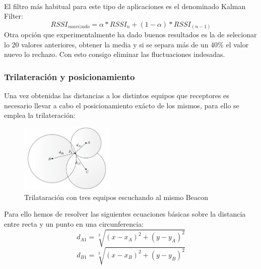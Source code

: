 \documentclass[a4paper ,12pt, onecolumn]{article}
\begin{document}
            \paragraph{}
            El filtro más habitual para este tipo de aplicaciones es el denominado Kalman Filter:
            \begin{equation}
                RSSI_{suavizado} = \alpha * RSSI_{n} + (1-\alpha) * RSSI_{(n-1)}
            \end{equation}
            Otra opción que experimentalmente ha dado buenos resultados es la de selecionar lo 20 valores anteriores,
            obtener la media y si se separa más de un 40\% el valor nuevo lo rechazo. Con esto consigo eliminar las 
            fluctuaciones indesadas.
        \subsubsection{Trilateración y posicionamiento}
            Una vez obtenidas las distancias a los distintos equipos que receptores es necesario llevar a cabo el
            posicionamiento exácto de los mismos, para ello se emplea la trilateración:
            \begin{center}
                \begin{figure}[h]
                    \centering
                    \includegraphics[width=0.4\textwidth]{trilateration_circle.png}
                    \caption{Trilataración con tres equipos escuchando al mismo Beacon}
                    \label{fig:mesh7}
                \end{figure}
            \end{center}
            Para ello hemos de resolver las siguientes ecuaciones básicas sobre la distancia entre recta y un punto en 
                una circunferencia:
                \begin{equation}
                    d_{A1}= \sqrt[2]{(x-x_A)^2+(y-y_A)^2}
                \end{equation}
                \begin{equation}
                d_{B1}= \sqrt[2]{(x-x_B)^2+(y-y_B)^2}
                \end{equation}
\end{document}
